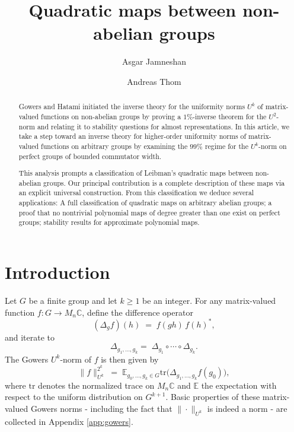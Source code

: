 \documentclass[a4paper,11pt]{amsproc}
\title{Quadratic maps between non-abelian groups}
\author{Asgar Jamneshan}
\author{Andreas Thom}
\theoremstyle{plain}
\theoremstyle{definition}
\begin{document}
\begin{abstract}
Gowers and Hatami initiated the inverse theory for the uniformity norms $U^k$ of matrix-valued functions on non-abelian groups by proving a $1\%$-inverse theorem for the $U^2$-norm and relating it to stability questions for almost representations.  In this article, we take a step toward an inverse theory for higher-order uniformity norms of matrix-valued functions on arbitrary groups by examining the  $99\%$ regime for the $U^k$-norm on perfect groups of bounded commutator width.

This analysis prompts a classification of Leibman’s quadratic maps between non-abelian groups.  Our principal contribution is a complete description of these maps via an explicit universal construction.  From this classification we deduce several applications: A full classification of quadratic maps on arbitrary abelian groups; a proof that no nontrivial polynomial maps of degree greater than one exist on perfect groups; stability results for approximate polynomial maps. 
\end{abstract}

\maketitle

\tableofcontents

\section{Introduction}

Let $G$ be a finite group and let $k\ge1$ be an integer.  For any matrix-valued function $f\colon G\to M_n \mathbb C$, define the difference operator
$$
(\Delta_g f)(h)\;=\;f(gh)\,f(h)^*,
$$
and iterate to
$$
\Delta_{g_1,\dots,g_k}
=\;\Delta_{g_1}\circ\cdots\circ\Delta_{g_k}.
$$
The Gowers $U^k$-norm of $f$ is then given by
$$
\|f\|_{U^k}^{2^k}
\;=\;
\mathbb{E}_{g_0,\dots,g_k\in G}
\mathrm{tr}\bigl(\Delta_{g_1,\dots,g_k}f(g_0)\bigr),
$$
where $\mathrm{tr}$ denotes the normalized trace on $M_n \mathbb C$ and $\mathbb{E}$ the expectation with respect to the uniform distribution on $G^{k+1}$.  Basic properties of these matrix-valued Gowers norms - including the fact that $\|\cdot\|_{U^k}$ is indeed a norm - are collected in Appendix \ref{app:gowers}.
\end{document}
